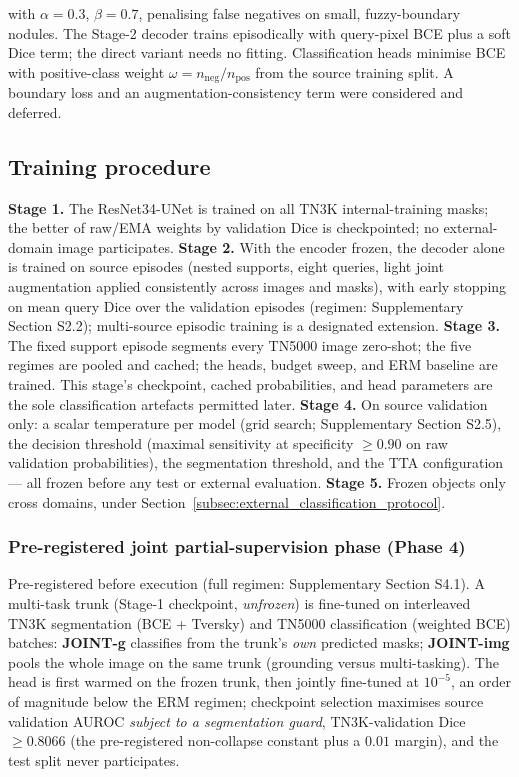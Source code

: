 \documentclass[jimh,article,submit,moreauthors,pdftex]{Definitions/tsp}
\begin{document}
with $\alpha=0.3$, $\beta=0.7$, penalising false negatives on small,
fuzzy-boundary nodules. The Stage-2 decoder trains episodically with
query-pixel BCE plus a soft Dice term; the direct variant needs no
fitting. Classification heads minimise BCE with positive-class weight
$\omega = n_{\mathrm{neg}}/n_{\mathrm{pos}}$ from the source training
split. A boundary loss and an augmentation-consistency term were
considered and deferred.

\subsection{Training procedure}
\label{subsec:meta_training}

\textbf{Stage 1.} The ResNet34-UNet is trained on all TN3K
internal-training masks; the better of raw/EMA weights by validation
Dice is checkpointed; no external-domain image participates.
\textbf{Stage 2.} With the encoder frozen, the decoder alone is trained
on source episodes (nested supports, eight queries, light joint
augmentation applied consistently across images and masks), with early
stopping on mean query Dice over the validation episodes (regimen:
Supplementary Section S2.2); multi-source episodic training is a
designated extension.
\textbf{Stage 3.} The fixed support episode segments every TN5000 image
zero-shot; the five regimes are pooled and cached; the heads, budget
sweep, and ERM baseline are trained. This stage's checkpoint, cached
probabilities, and head parameters are the sole classification
artefacts permitted later.
\textbf{Stage 4.} On source validation only: a scalar temperature per
model (grid search; Supplementary Section S2.5), the decision threshold
(maximal sensitivity at specificity $\geq 0.90$ on raw validation
probabilities), the segmentation threshold, and the TTA configuration
--- all frozen before any test or external evaluation.
\textbf{Stage 5.} Frozen objects only cross domains, under
Section~\ref{subsec:external_classification_protocol}.

\subsubsection{Pre-registered joint partial-supervision phase (Phase 4)}
\label{subsec:phase4_preregistered}

Pre-registered before execution (full regimen: Supplementary Section
S4.1). A multi-task trunk (Stage-1 checkpoint, \emph{unfrozen}) is
fine-tuned on interleaved TN3K segmentation (BCE + Tversky) and TN5000
classification (weighted BCE) batches: \textbf{JOINT-g} classifies from
the trunk's \emph{own} predicted masks; \textbf{JOINT-img} pools the
whole image on the same trunk (grounding versus multi-tasking). The
head is first warmed on the frozen trunk, then jointly fine-tuned at
$10^{-5}$, an order of magnitude below the ERM regimen; checkpoint
selection maximises source validation AUROC \emph{subject to a
segmentation guard}, TN3K-validation Dice $\geq 0.8066$ (the
pre-registered non-collapse constant plus a $0.01$ margin), and the
test split never participates.
\end{document}
